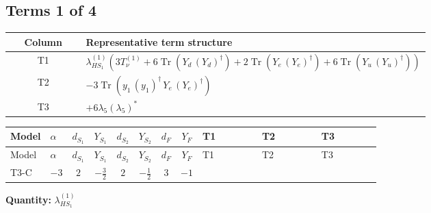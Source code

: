 \documentclass[8pt]{article}
\begin{document}
\begin{landscape}
\subsection*{Terms 1 of 4}
\begin{center}
\begin{tabular}{@{}c >{\raggedright\arraybackslash}p{0.82\linewidth}@{}}
\toprule
Column & Representative term structure \\
\midrule
T1 & \(\displaystyle {\lambda_{HS_1}^{(1)}} (3 T_{\nu}^{(1)}+6 \operatorname{Tr}\!\left({Y_d}\,\left({Y_d}\right)^{\dagger}\right)+2 \operatorname{Tr}\!\left({Y_e}\,\left({Y_e}\right)^{\dagger}\right)+6 \operatorname{Tr}\!\left({Y_u}\,\left({Y_u}\right)^{\dagger}\right))\) \\
\midrule
T2 & \(\displaystyle -3 \operatorname{Tr}\!\left({y_1}\,\left({y_1}\right)^{\dagger}\,{Y_e}\,\left({Y_e}\right)^{\dagger}\right)\) \\
\midrule
T3 & \(\displaystyle +6 {\lambda_5} \left({\lambda_5}\right)^{*}\) \\
\midrule
\bottomrule
\end{tabular}
\end{center}
\smallskip
\tiny
\begin{longtable}{@{}llcccccc >{\raggedright\arraybackslash}p{0.21\linewidth} >{\raggedright\arraybackslash}p{0.21\linewidth} >{\raggedright\arraybackslash}p{0.21\linewidth}@{}}
\toprule
Model & $\alpha$ & $d_{S_1}$ & $Y_{S_1}$ & $d_{S_2}$ & $Y_{S_2}$ & $d_F$ & $Y_F$ & T1 & T2 & T3 \\
\midrule
\endfirsthead
\toprule
Model & $\alpha$ & $d_{S_1}$ & $Y_{S_1}$ & $d_{S_2}$ & $Y_{S_2}$ & $d_F$ & $Y_F$ & T1 & T2 & T3 \\
\midrule
\endhead
T3-C & $-3$ & $2$ & $-\frac{3}{2}$ & $2$ & $-\frac{1}{2}$ & $3$ & $-1$ & \scriptsize\adjustbox{max width=\linewidth}{$\begin{gathered} {\lambda_{HS_1}^{(1)}} (3 T_{\nu}^{(1)}+6 \operatorname{Tr}\!\left({Y_d}\,\left({Y_d}\right)^{\dagger}\right)+2 \operatorname{Tr}\!\left({Y_e}\,\left({Y_e}\right)^{\dagger}\right)+6 \operatorname{Tr}\!\left({Y_u}\,\left({Y_u}\right)^{\dagger}\right))\end{gathered}$} & \scriptsize\adjustbox{max width=\linewidth}{$\begin{gathered} -3 \operatorname{Tr}\!\left({y_1}\,\left({y_1}\right)^{\dagger}\,{Y_e}\,\left({Y_e}\right)^{\dagger}\right)\end{gathered}$} & \scriptsize\adjustbox{max width=\linewidth}{$\begin{gathered} +6 {\lambda_5} \left({\lambda_5}\right)^{*}\end{gathered}$} \\
\midrule
\bottomrule
\end{longtable}
\clearpage
\noindent\textbf{Quantity: }$\lambda_{HS_1}^{(1)}$\par\smallskip

\end{landscape}
\end{document}
